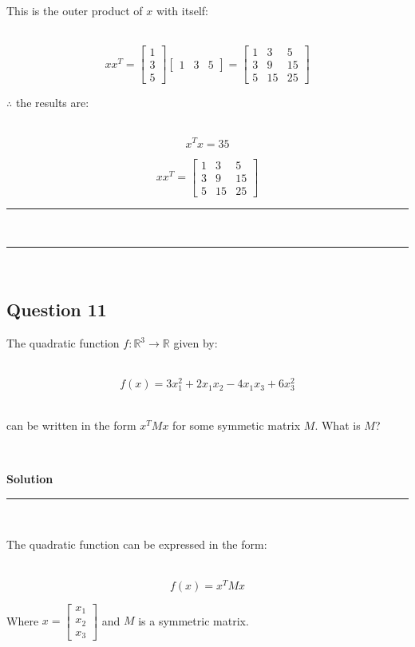 \documentclass{article}
\begin{document}
\parbox{\textwidth}{This is the outer product of $x$ with itself:}\\

$$xx^T = \begin{bmatrix} 1 \\ 3 \\ 5 \end{bmatrix} \begin{bmatrix} 1 & 3 & 5 \end{bmatrix} = \begin{bmatrix} 1 & 3 & 5 \\ 3 & 9 & 15 \\ 5 & 15 & 25 \end{bmatrix}$$

\parbox{\textwidth}{$\therefore$ the results are:}\\

$$x^Tx = 35$$

$$xx^T = \begin{bmatrix} 1 & 3 & 5 \\ 3 & 9 & 15 \\ 5 & 15 & 25 \end{bmatrix}$$

\noindent\rule{\textwidth}{0.4pt}\\
\noindent\rule{\textwidth}{0.4pt}\\

\newpage

\subsection*{Question 11}

\parbox{\textwidth}{The quadratic function $f : \mathbb{R}^3 \rightarrow \mathbb{R}$ given by:}\\

$$f(x) = 3x^2_1 +2x_1x_2 -4x_1x_3 +6x^2_3$$\\

\parbox{\textwidth}{can be written in the form $x^TMx$ for some symmetic matrix $M$. What is $M$?}\\

\parbox{\textwidth}{\textbf{Solution}}

\noindent\rule{\textwidth}{0.4pt}\\

\parbox{\textwidth}{The quadratic function can be expressed in the form:}\\

$$f(x) = x^TMx$$

\parbox{\textwidth}{Where $x = \begin{bmatrix} x_1 \\ x_2 \\ x_3 \end{bmatrix}$ and $M$ is a symmetric matrix.}\\
\end{document}
